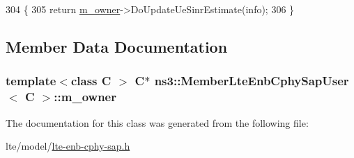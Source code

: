 \begin{DoxyCode}
304 \{
305   \textcolor{keywordflow}{return} \hyperlink{classns3_1_1MemberLteEnbCphySapUser_a99f9d9d65a857057481e602c88cb5f04}{m\_owner}->DoUpdateUeSinrEstimate(info);
306 \}
\end{DoxyCode}


\subsection{Member Data Documentation}
\subsubsection[{\texorpdfstring{m\+\_\+owner}{m_owner}}]{\setlength{\rightskip}{0pt plus 5cm}template$<$class C $>$ {\bf C}$\ast$ {\bf ns3\+::\+Member\+Lte\+Enb\+Cphy\+Sap\+User}$<$ {\bf C} $>$\+::m\+\_\+owner\hspace{0.3cm}{\ttfamily [private]}}\hypertarget{classns3_1_1MemberLteEnbCphySapUser_a99f9d9d65a857057481e602c88cb5f04}{}\label{classns3_1_1MemberLteEnbCphySapUser_a99f9d9d65a857057481e602c88cb5f04}


The documentation for this class was generated from the following file\+:\begin{DoxyCompactItemize}
\item 
lte/model/\hyperlink{lte-enb-cphy-sap_8h}{lte-\/enb-\/cphy-\/sap.\+h}\end{DoxyCompactItemize}
